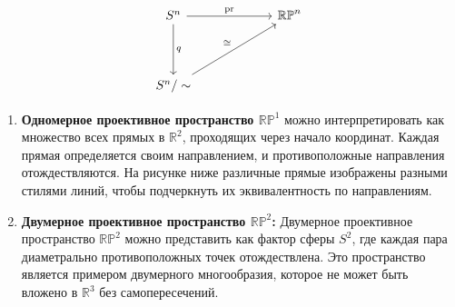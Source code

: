 \[
\begin{tikzcd}[row sep=40pt, column sep=60pt]
    S^n \arrow{r}{\mathrm{pr}} \arrow{d}{q} & \mathbb{RP}^n \\
    S^n / \sim \arrow{ur}{\cong}
\end{tikzcd}
\]
\begin{example}
    \begin{enumerate}
        \item \textbf{Одномерное проективное пространство $ \mathbb{RP}^1 $} можно интерпретировать как множество всех прямых в $ \mathbb{R}^2 $, проходящих через начало координат. Каждая прямая определяется своим направлением, и противоположные направления отождествляются. На рисунке ниже различные прямые изображены разными стилями линий, чтобы подчеркнуть их эквивалентность по направлениям.
        \begin{center}
        \end{center}
        \item \textbf{Двумерное проективное пространство $ \mathbb{RP}^2 $:}
        Двумерное проективное пространство $ \mathbb{RP}^2 $ можно представить как фактор сферы $ S^2 $, где каждая пара диаметрально противоположных точек отождествлена. Это пространство является примером двумерного многообразия, которое не может быть вложено в $ \mathbb{R}^3 $ без самопересечений.
    \end{enumerate}
\end{example}

